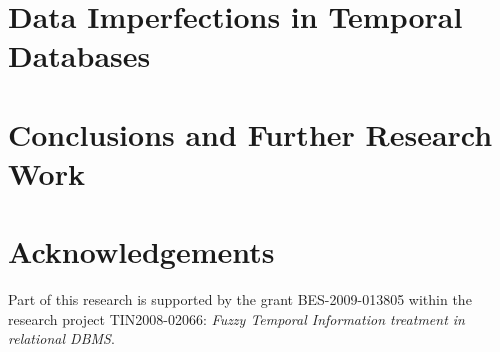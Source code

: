 \documentclass[graybox]{svmult}
\begin{document}
\section{Data Imperfections in Temporal Databases}
\label{sec:imprecision-uncertainty}


%
\def\JPicScale{1}
\section{Conclusions and Further Research Work}
\label{sec:further-research-work}

\def\JPicScale{1}
\section*{Acknowledgements}
Part of this research is supported by the grant BES-2009-013805 within the research project TIN2008-02066: \emph{Fuzzy Temporal Information treatment in relational DBMS}.



\def\JPicScale{0.5}


%
\end{document}
